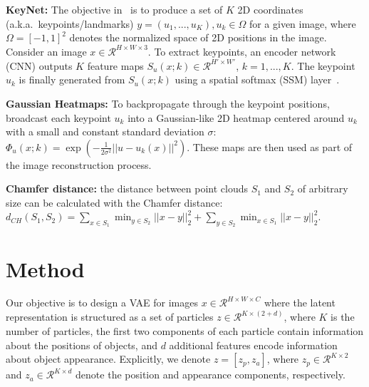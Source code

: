 \documentclass[nohyperref]{article}
\theoremstyle{plain}
\theoremstyle{definition}
\theoremstyle{remark}
\begin{document}
\textbf{KeyNet:} The objective in~\citet{jakab2018unsupervised} is to produce a set of $K$ 2D coordinates (a.k.a.~keypoints/landmarks) $y=(u_1,...,u_K), u_k\in \Omega$ for a given image, where $\Omega = [-1,1]^2$ denotes the normalized space of 2D positions in the image.
Consider an image $x \in \mathcal{R}^{H \times W \times 3}$. To extract keypoints, an encoder network (CNN) outputs $K$ feature maps $S_u(x;k) \in \mathcal{R}^{H' \times W'}$, $k=1,...,K$.
The keypoint $u_k$ is finally generated from $S_u(x;k)$ using a spatial softmax (SSM) layer~\cite{finn2016deep}.

\textbf{Gaussian Heatmaps:} To backpropagate through the keypoint positions, \citet{jakab2018unsupervised} broadcast each keypoint $u_k$ into a Gaussian-like 2D heatmap centered around $u_k$ with a small and constant standard deviation $\sigma$: $\Phi_u(x;k) = \exp{\left(-\frac{1}{2\sigma^2}|| u - u_k(x)||^2\right)} .$ These maps are then used as part of the image reconstruction process.

\textbf{Chamfer distance:} the distance between point clouds $S_1$ and $S_2$ of arbitrary size can be calculated with the Chamfer distance: $ d_{CH}(S_1, S_2) = \sum_{x \in S_1}\min_{y \in S_2}||x-y||_2^2 + \sum_{y \in S_2}\min_{x \in S_1}||x-y||_2^2.$
\section{Method}
\label{sec:method}

Our objective is to design a VAE for images $x \in \mathcal{R}^{H \times W \times C}$ where the latent representation is structured as a set of particles $z  \in \mathcal{R}^{K \times (2+d)}$, where $K$ is the number of particles, the first two components of each particle contain information about the positions of objects, and $d$ additional features encode information about object appearance. Explicitly, we denote $z =[z_p, z_a]$, where $z_p \in \mathcal{R}^{K \times 2}$ and $z_a  \in \mathcal{R}^{K \times d}$ denote the position and appearance components, respectively.
\end{document}
